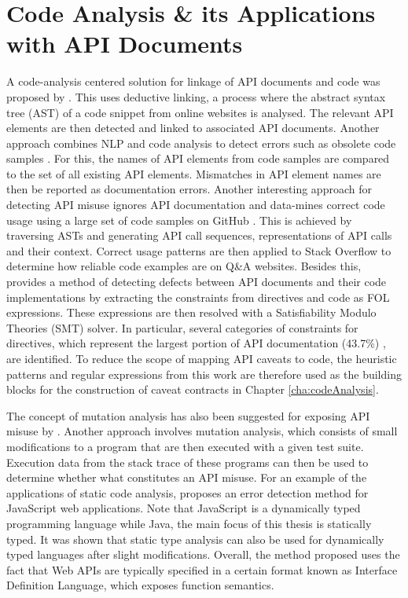 \section{Code Analysis \& its Applications with API Documents}
\label{sec:related-static-code-analysis}
A code-analysis centered solution for linkage of API documents and code was proposed by \cite{live-api-doc}. This uses deductive linking, a process where the abstract syntax tree (AST) of a code snippet from online websites is analysed. The relevant API elements are then detected and linked to associated API documents. Another approach combines NLP and code analysis to detect errors such as obsolete code samples \cite{zhong2013detecting}. For this, the names of API elements from code samples are compared to the set of all existing API elements. Mismatches in API element names are then be reported as documentation errors. Another interesting approach for detecting API misuse ignores API documentation and data-mines correct code usage using a large set of code samples on GitHub \cite{code-examples}. This is achieved by traversing ASTs and generating API call sequences, representations of API calls and their context. Correct usage patterns are then applied to Stack Overflow to determine how reliable code examples are on Q\&A websites. Besides this, \cite{zhou-directive} provides a method of detecting defects between API documents and their code implementations by extracting the constraints from directives and code as FOL expressions. These expressions are then resolved with a Satisfiability Modulo Theories (SMT) solver. In particular, several categories of constraints for directives, which represent the largest portion of API documentation (43.7\%) \cite{monperrus2012should}, are identified. To reduce the scope of mapping API caveats to code, the heuristic patterns and regular expressions from this work are therefore used as the building blocks for the construction of caveat contracts in Chapter \ref{cha:codeAnalysis}. \bigbreak

The concept of mutation analysis has also been suggested for exposing API misuse by \cite{mutation-analysis}. Another approach involves mutation analysis, which consists of small modifications to a program that are then executed with a given test suite. Execution data from the stack trace of these programs can then be used to determine whether what constitutes an API misuse. For an example of the applications of static code analysis,  \cite{bae2014safewapi} proposes an error detection method for JavaScript web applications. Note that JavaScript is a dynamically typed programming language while Java, the main focus of this thesis is statically typed. It was shown that static type analysis can also be used for dynamically typed languages after slight modifications. Overall, the method proposed uses the fact that Web APIs are typically specified in a certain format known as Interface Definition Language, which exposes function semantics.

